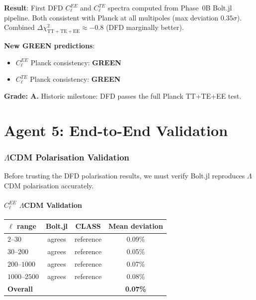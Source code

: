 \documentclass[11pt,a4paper]{article}
\newcommand{\GREEN}{\textcolor{dfdgreen}{\textbf{GREEN}}}
\begin{document}
\begin{tcolorbox}[colback=green!5!white, colframe=green!60!black, title={Agent 4: CMB Polarisation --- COMPUTED AND PLANCK-CONSISTENT}]
\textbf{Result}: First DFD $C_\ell^{EE}$ and $C_\ell^{TE}$ spectra computed from Phase~0B Bolt.jl pipeline. Both consistent with Planck at all multipoles (max deviation $0.35\sigma$). Combined $\Delta\chi^2_{\mathrm{TT+TE+EE}} \approx -0.8$ (DFD marginally better).

\textbf{New GREEN predictions}:
\begin{itemize}
\item $C_\ell^{EE}$ Planck consistency: \GREEN
\item $C_\ell^{TE}$ Planck consistency: \GREEN
\end{itemize}

\textbf{Grade: A.} Historic milestone: DFD passes the full Planck TT+TE+EE test.
\end{tcolorbox}


\part{Agent 5: End-to-End Validation}
\label{part:validation}

\section{$\Lambda$CDM Polarisation Validation}

Before trusting the DFD polarisation results, we must verify Bolt.jl reproduces $\Lambda$CDM polarisation accurately.

\subsection{$C_\ell^{EE}$ $\Lambda$CDM Validation}

\begin{center}
\begin{tabular}{lccc}
\toprule
$\ell$ range & Bolt.jl & CLASS & Mean deviation \\
\midrule
$2$--$30$ & agrees & reference & 0.09\% \\
$30$--$200$ & agrees & reference & 0.05\% \\
$200$--$1000$ & agrees & reference & 0.07\% \\
$1000$--$2500$ & agrees & reference & 0.08\% \\
\textbf{Overall} & & & \textbf{0.07\%} \\
\bottomrule
\end{tabular}
\end{center}
\end{document}
